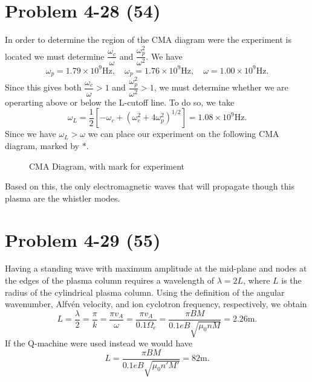 \section*{Problem 4-28 (54)}
\label{sec:4-28}
In order to determine the region of the CMA diagram were the experiment is located we must determine \(\dfrac{\omega_c}{\omega} \) and \(\dfrac{\omega_p^2}{\omega^2} \). We have 
\begin{equation*}
	\omega_p = 1.79 \times 10^{9}\text{Hz}, \quad \omega_p = 1.76 \times 10^{9}\text{Hz}, \quad \omega = 1.00 \times 10^{9}\text{Hz}.
\end{equation*}
Since this gives both \(\dfrac{\omega_c}{\omega} > 1 \) and \(\dfrac{\omega_p^2}{\omega^2} > 1\), we must determine whether we are operarting above or below the L-cutoff line. To do so, we take 
\begin{equation*}
	\omega_L  =\frac{1}{2}\left[-\omega_c + \left(\omega_c^2 + 4\omega_p^2\right)^{1/2} \right] = 1.08 \times 10^{9}\text{Hz}.
\end{equation*}
Since we have \(\omega_L > \omega \) we can place our experiment on the following CMA diagram, marked by \(\ast \).
\\
\begin{figure}[H]
\centering	
	\caption{CMA Diagram, with mark for experiment}
\end{figure}
Based on this, the only electromagnetic waves that will propagate though this plasma are the whistler modes. 

\section*{Problem 4-29 (55)}
\label{sec:4-29}
Having a standing wave with maximum amplitude at the mid-plane and nodes at the edges of the plasma column requires a wavelength of \(\lambda = 2L \), where \(L\) is the radius of the cylindrical plasma column. Using the definition of the angular wavenumber, Alfv\'en velocity, and ion cyclotron frequency, respectively, we obtain
\begin{equation*}
	L = \dfrac{\lambda}{2} = \dfrac{\pi}{k} = \dfrac{\pi v_A}{\omega} = \dfrac{\pi v_A}{0.1\Omega_c} = \dfrac{\pi B M}{0.1eB\sqrt{\mu_0nM}} = 2.26\text{m}.
\end{equation*}
If the Q-machine were used instead we would have
\begin{equation*}
	L =  \dfrac{\pi B M}{0.1eB\sqrt{\mu_0n'M'}} = 82\text{m}.
\end{equation*}

